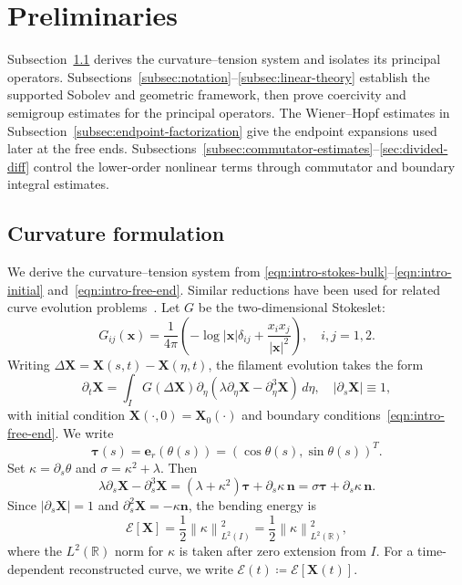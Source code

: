 \documentclass[11pt,reqno]{amsart}
\theoremstyle{plain}
\theoremstyle{definition}
\numberwithin{equation}{section}
\newcommand{\paren}[1]{\left(#1\right)}
\newcommand{\p}{\partial}
\newcommand{\mc}[1]{\mathcal{#1}}
\newcommand{\bm}[1]{\boldsymbol{#1}}
\newcommand{\abs}[1]{\left\lvert #1 \right\rvert}
\newcommand{\norm}[1]{\left\lVert #1 \right\rVert}
\newcommand{\R}{\mathbb{R}}
\begin{document}
\section{Preliminaries}
\label{sec:formulation}
\label{sec:prelim}

Subsection~\ref{subsec:curvature-formulation} derives the curvature--tension
system and isolates its principal operators.
Subsections~\ref{subsec:notation}--\ref{subsec:linear-theory} establish the
supported Sobolev and geometric framework, then prove coercivity and
semigroup estimates for the principal operators.
The Wiener--Hopf estimates in Subsection~\ref{subsec:endpoint-factorization}
give the endpoint expansions used later at the free ends.
Subsections~\ref{subsec:commutator-estimates}--\ref{sec:divided-diff}
control the lower-order nonlinear terms through commutator and
boundary integral estimates.

\subsection{Curvature formulation}
\label{subsec:curvature-formulation}
We derive the curvature--tension system from
\eqref{eqn:intro-stokes-bulk}--\eqref{eqn:intro-initial} and~\eqref{eqn:intro-free-end}.
Similar reductions have been used for related curve evolution
problems~\cite{Oelz2011CurveStraightening,MoriOhm2023Elastohydrodynamics,
Ohm2026NonlocalCurve}.
Let $G$ be the two-dimensional Stokeslet:
\begin{equation}\label{eqn:stokeslet-definition}
    G_{ij}(\bm x) = \frac{1}{4\pi}\paren{-\log|\bm x|\delta_{ij} + \frac{x_i x_j}{|\bm x|^2}}, \quad i,j = 1,2.
\end{equation}
Writing $\Delta\bm X=\bm X(s,t)-\bm X(\eta,t)$, the filament evolution takes
the form
\begin{equation}\label{eqn:filament-boundary-evolution}
    \p_t\bm X=\int_I G(\Delta\bm X)\p_\eta\paren{\lambda\p_\eta\bm X  -\p_\eta^3\bm X}\,d\eta,\quad \abs{\p_s\bm X} \equiv 1,
\end{equation}
with initial condition $\bm X(\cdot,0)=\bm X_0(\cdot)$ and boundary
conditions~\eqref{eqn:intro-free-end}.
We write
\begin{equation}
    \bm\tau(s)=\bm e_r(\theta(s))
    =\paren{\cos\theta(s),\sin\theta(s)}^T.
\end{equation}
Set $\kappa=\p_s\theta$ and $\sigma=\kappa^2+\lambda$. Then
\begin{equation}
    \lambda\p_s\bm X-\p_s^3\bm X
    =
    \paren{\lambda+\kappa^2}\bm\tau+\p_s\kappa\,\bm n
    =
    \sigma\bm\tau+\p_s\kappa\,\bm n .
\end{equation}
Since $\abs{\p_s\bm X}=1$ and $\p_s^2\bm X=-\kappa\bm n$, the bending
energy is
\begin{equation}\label{eqn:curvature-energy}
    \mc E[\bm X]
    =\frac12\norm{\kappa}_{L^2(I)}^2
    =\frac12\norm{\kappa}_{L^2(\R)}^2,
\end{equation}
where the $L^2(\R)$ norm for $\kappa$ is taken after zero extension from $I$.
For a time-dependent reconstructed curve, we write
$\mc E(t)\coloneqq\mc E[\bm X(t)]$.
\end{document}
